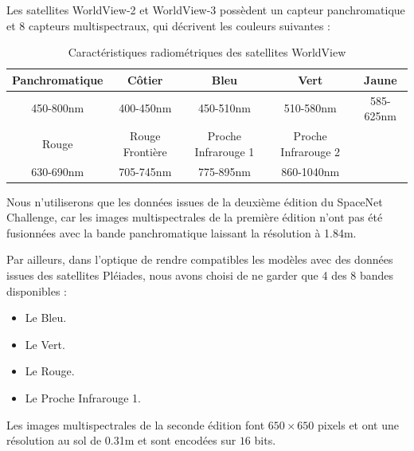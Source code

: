 \documentclass[a4paper, 11pt]{report}
\begin{document}
Les satellites WorldView-2 et WorldView-3 possèdent un capteur panchromatique et $8$ capteurs multispectraux, qui décrivent les couleurs suivantes :
\begin{table}[H]
	\centering
	\begin{tabular}{|c|c|c|c|c|}
	\hline 
	Panchromatique & Côtier & Bleu & Vert & Jaune \\ 
	\hline 
	450-800nm & 400-450nm & 450-510nm & 510-580nm & 585-625nm \\ 
	\hline 
	Rouge & Rouge Frontière & Proche Infrarouge 1 & Proche Infrarouge 2 & \\ 
	\hline 
	630-690nm & 705-745nm & 775-895nm & 860-1040nm & \\ 
	\hline 
	\end{tabular}
	\caption{Caractéristiques radiométriques des satellites WorldView}
\end{table}

Nous n'utiliserons que les données issues de la deuxième édition du SpaceNet Challenge, car les images multispectrales de la première édition n'ont pas été fusionnées avec la bande panchromatique laissant la résolution à 1.84m.

Par ailleurs, dans l'optique de rendre compatibles les modèles avec des données issues des satellites Pléiades, nous avons choisi de ne garder que 4 des 8 bandes disponibles :
\begin{itemize}
	\item Le Bleu.
	\item Le Vert.
	\item Le Rouge.
	\item Le Proche Infrarouge 1.
\end{itemize}

Les images multispectrales de la seconde édition font $650 \times 650$ pixels et ont une résolution au sol de 0.31m et sont encodées sur $16$ bits.
\end{document}
